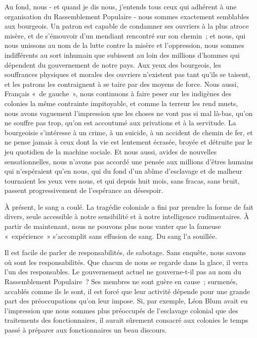 \documentclass[french,twoside]{book} %
\begin{document}
\par
Au fond, nous - et quand je dis nous, j'entends tous ceux qui adhérent à une organisation du Rassemblement Populaire - nous sommes exactement semblables aux bourgeois. Un patron est capable de condamner ses ouvriers à la plus atroce misère, et de s'émouvoir d'un mendiant rencontré sur son chemin ; et nous, qui nous unissons au nom de la lutte contre la misère et l'oppression, nous sommes indifférents au sort inhumain que subissent au loin des millions d'hommes qui dépendent du gouvernement de notre pays. Aux yeux des bourgeois, les souffrances physiques et morales des ouvriers n'existent pas tant qu'ils se taisent, et les patrons les contraignent à se taire par des moyens de force. Nous aussi, Français « de gauche », nous continuons à faire peser sur les indigènes des colonies la même contrainte impitoyable, et comme la terreur les rend muets, nous avons vaguement l'impression que les choses ne vont pas si mal là-bas, qu'on ne souffre pas trop, qu'on est accoutumé aux privations et à la servitude. La bourgeoisie s'intéresse à un crime, à un suicide, à un accident de chemin de fer, et ne pense jamais à ceux dont la vie est lentement écrasée, broyée et détruite par le jeu quotidien de la machine sociale. Et nous aussi, avides de nouvelles sensationnelles, nous n'avons pas accordé une pensée aux millions d'êtres humains qui n'espéraient qu'en nous, qui du fond d'un abîme d'esclavage et de malheur tournaient les yeux vers nous, et qui depuis huit mois, sans fracas, sans bruit, passent progressivement de l'espérance au désespoir.\par
À présent, le sang a coulé. La tragédie coloniale a fini par prendre la forme de fait divers, seule accessible à notre sensibilité et à notre intelligence rudimentaires. À partir de maintenant, nous ne pouvons plus nous vanter que la fameuse « expérience » s'accomplit sans effusion de sang. Du sang l'a souillée.\par
Il est facile de parler de responsabilités, de sabotage. Sans enquête, nous savons où sont les responsabilités. Que chacun de nous se regarde dans la glace, il verra l'un des responsables. Le gouvernement actuel ne gouverne-t-il pas au nom du Rassemblement Populaire ? Ses membres ne sont guère en cause ; surmenés, accablés comme ils le sont, il est forcé que leur activité dépende pour une grande part des préoccupations qu'on leur impose. Si, par exemple, Léon Blum avait eu l'impression que nous sommes plus préoccupés de l'esclavage colonial que des traitements des fonctionnaires, il aurait sûrement consacré aux colonies le temps passé à préparer aux fonctionnaires un beau discours.\par
\end{document}
